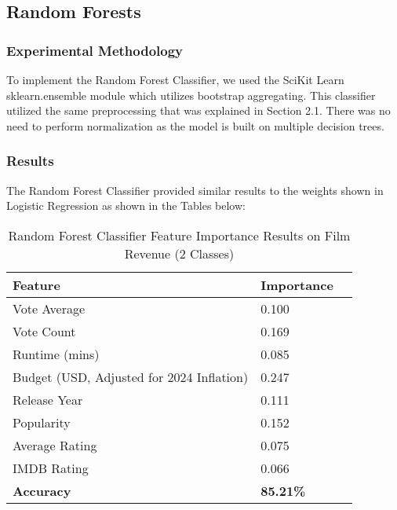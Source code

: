 \documentclass{article}
\begin{document}
\subsection{Random Forests}
\subsubsection{Experimental Methodology}
To implement the Random Forest Classifier, we used the SciKit Learn sklearn.ensemble module which utilizes bootstrap aggregating. This classifier utilized the same preprocessing that was explained in Section 2.1. There was no need to perform normalization as the model is built on multiple decision trees.

\subsubsection{Results}
The Random Forest Classifier provided similar results to the weights shown in Logistic Regression as shown in the Tables below:

\begin{table}[H]
    \centering
    \begin{tabular}{|l|l|l|}
        \hline
        \textbf{Feature} & \textbf{Importance} \\ \hline
        Vote Average & 0.100 \\ \hline
        Vote Count & 0.169 \\ \hline
        Runtime (mins) & 0.085 \\ \hline
        Budget (USD, Adjusted for 2024 Inflation) & 0.247 \\ \hline
        Release Year & 0.111 \\ \hline
        Popularity & 0.152 \\ \hline
        Average Rating & 0.075 \\ \hline
        IMDB Rating & 0.066 \\ \hline
        \hline
        \textbf{Accuracy} & \textbf{85.21\%} \\ \hline
    \end{tabular}
    \caption{Random Forest Classifier Feature Importance Results on Film Revenue (2 Classes)}
    \label{fig:rf_feature importances_2}
\end{table}
\end{document}
